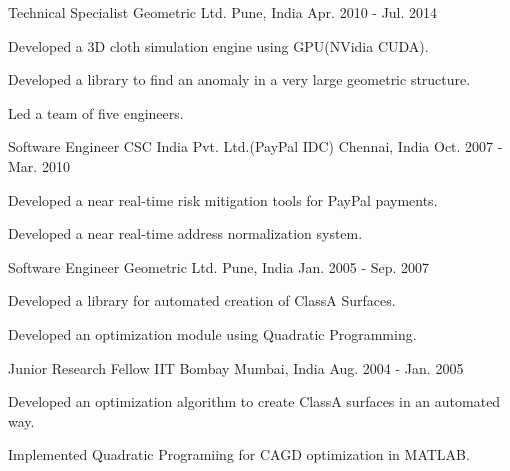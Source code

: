 \begin{cventries}
  \cventry
    {Technical Specialist} %
    {Geometric Ltd.} %
    {Pune, India} %
    {Apr. 2010 - Jul. 2014} %
    {
      \begin{cvitems} %
        \item {Developed a 3D cloth simulation engine using GPU(NVidia CUDA).}
        \item {Developed a library to find an anomaly in a very large geometric structure.}
        \item {Led a team of five engineers.}
      \end{cvitems}
    }

  \cventry
    {Software Engineer} %
    {CSC India Pvt. Ltd.(PayPal IDC)} %
    {Chennai, India} %
    {Oct. 2007 - Mar. 2010} %
    {
      \begin{cvitems} %
        \item {Developed a near real-time risk mitigation tools for PayPal payments.}
        \item {Developed a near real-time address normalization system.}
      \end{cvitems}
    }

  \cventry
    {Software Engineer} %
    {Geometric Ltd.} %
    {Pune, India} %
    {Jan. 2005 - Sep. 2007} %
    {
      \begin{cvitems} %
        \item {Developed a library for automated creation of ClassA Surfaces.}
        \item {Developed an optimization module using Quadratic Programming.} 
      \end{cvitems}
    }

  \cventry
    {Junior Research Fellow} %
    {IIT Bombay} %
    {Mumbai, India} %
    {Aug. 2004 - Jan. 2005} %
    {
      \begin{cvitems} %
        \item {Developed an optimization algorithm to create ClassA surfaces in an automated way.}
        \item {Implemented Quadratic Programiing for CAGD optimization in MATLAB.}
      \end{cvitems}
    }
\end{cventries}
